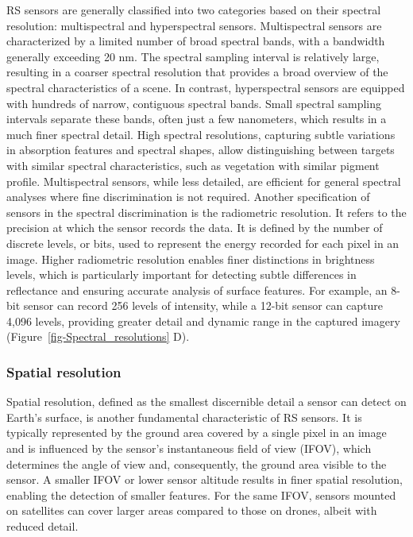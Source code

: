 \documentclass[
  letterpaper,
  11pt,
  english,
  singlespacing,
  headsepline]{MastersDoctoralThesis}
\begin{document}
\begin{spacing}{1.5}
RS sensors are generally classified into two categories based on their
spectral resolution: multispectral and hyperspectral sensors.
Multispectral sensors are characterized by a limited number of broad
spectral bands, with a bandwidth generally exceeding 20 nm. The spectral
sampling interval is relatively large, resulting in a coarser spectral
resolution that provides a broad overview of the spectral
characteristics of a scene. In contrast, hyperspectral sensors are
equipped with hundreds of narrow, contiguous spectral bands. Small
spectral sampling intervals separate these bands, often just a few
nanometers, which results in a much finer spectral detail. High spectral
resolutions, capturing subtle variations in absorption features and
spectral shapes, allow distinguishing between targets with similar
spectral characteristics, such as vegetation with similar pigment
profile. Multispectral sensors, while less detailed, are efficient for
general spectral analyses where fine discrimination is not required.
Another specification of sensors in the spectral discrimination is the
radiometric resolution. It refers to the precision at which the sensor
records the data. It is defined by the number of discrete levels, or
bits, used to represent the energy recorded for each pixel in an image.
Higher radiometric resolution enables finer distinctions in brightness
levels, which is particularly important for detecting subtle differences
in reflectance and ensuring accurate analysis of surface features. For
example, an 8-bit sensor can record 256 levels of intensity, while a
12-bit sensor can capture 4,096 levels, providing greater detail and
dynamic range in the captured imagery
(Figure~\ref{fig-Spectral_resolutions} D).

\subsubsection{Spatial resolution}\label{spatial-resolution}

Spatial resolution, defined as the smallest discernible detail a sensor
can detect on Earth's surface, is another fundamental characteristic of
RS sensors. It is typically represented by the ground area covered by a
single pixel in an image and is influenced by the sensor's instantaneous
field of view (IFOV), which determines the angle of view and,
consequently, the ground area visible to the sensor. A smaller IFOV or
lower sensor altitude results in finer spatial resolution, enabling the
detection of smaller features. For the same IFOV, sensors mounted on
satellites can cover larger areas compared to those on drones, albeit
with reduced detail.


\end{spacing}
\end{document}
